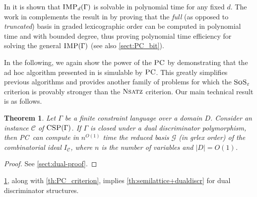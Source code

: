 \documentclass[11pt]{article}
\newcommand{\sos}{\text{\sc{SoS}}}
\newcommand{\Cc}{\mathcal{C}}
\newcommand{\CSP}{\textsc{CSP}}
\newcommand{\IMP}{\textsc{IMP}}
\newcommand{\PC}{\textsc{PC}}
\newcommand{\Nsatz}{\textsc{Nsatz}}
\newcommand{\grlex}{\textsf{grlex }}
\newcommand{\1}{\textbf{1}}
\newcommand{\GB}{\text{Gr\"{o}bner} }
\newtheorem{theorem}{Theorem}[section]
\begin{document}
In \cite{BulatovRSTOC22} it is shown that $\IMP_d(\Gamma)$ is solvable in polynomial time for any fixed $d$. The work in \cite{BharathiM21} complements the result in \cite{BulatovRSTOC22} by proving that the \textit{full} (as opposed to \textit{truncated}) \GB basis in graded lexicographic order can be computed in polynomial time and with bounded degree, thus proving polynomial time efficiency for solving the general $\IMP(\Gamma)$ (see also \cref{sect:PC_bit}).

In the following, we again show the power of the $\PC$ by demonstrating that the ad hoc algorithm presented in \cite{BharathiM21} is simulable by $\PC$. 
This greatly simplifies previous algorithms \cite{BulatovRSTOC22, BharathiM21, BharathiM22} and provides another family of problems for which the $\sos_{\varepsilon}$ criterion is provably stronger than the $\Nsatz$ criterion.
Our main technical result is as follows.
\begin{theorem}\label{th:dual_discriminator}
    Let $\Gamma$ be a finite constraint language over a domain $D$. Consider an instance $\Cc$ of $\CSP(\Gamma)$. If $\Gamma$ is closed under a dual discriminator polymorphism, then \PC\ can compute in $n^{O(1)}$ time the reduced \GB basis $\mathcal{G}$ (in \grlex order) of the combinatorial ideal $I_\Cc$, where $n$ is the number of variables and $|D|=O(1)$.
\end{theorem}
\begin{proof}
    See \cref{sect:dual-proof}.
\end{proof}
\cref{th:dual_discriminator}, along with \cref{th:PC_criterion}, implies \cref{th:semilattice+dualdiscr} for dual discriminator structures. 

\end{document}
